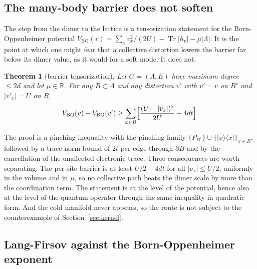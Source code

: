 \documentclass[11pt]{article}
\newtheorem{theorem}{Theorem}[section]
\theoremstyle{definition}
\theoremstyle{remark}
\begin{document}
\subsection{The many-body barrier does not soften}

The step from the dimer to the lattice is a tensorization statement for the
Born-Oppenheimer potential
$V_{\mathrm{BO}}(v)=\sum_{x}v_{x}^{2}/(2U)-\operatorname{Tr}|h_{v}|-\mu|\Lambda|$.
It is the point at which one might fear that a collective distortion lowers the
barrier far below its dimer value, as it would for a soft mode. It does not.

\begin{theorem}[barrier tensorization]\label{thm:valleytensor}
Let $G=(\Lambda,E)$ have maximum degree $\le2d$ and let $\mu\in\mathbb{R}$. For
any $B\subset\Lambda$ and any distortion $v'$ with $v'=v$ on $B^{c}$ and
$|v'_{x}|=U$ on $B$,
\begin{equation}
V_{\mathrm{BO}}(v)-V_{\mathrm{BO}}(v')
\ge\sum_{x\in B}\Bigl[\frac{(U-|v_{x}|)^{2}}{2U}-4dt\Bigr].
\label{eq:valleytensor}
\end{equation}
\end{theorem}

The proof is a pinching inequality with the pinching family
$\{P_{B^{c}}\}\cup\{|x\rangle\langle x|\}_{x\in B}$, followed by a trace-norm
bound of $2t$ per edge through $\partial B$ and by the cancellation of the
unaffected electronic trace. Three consequences are worth separating. The per-site
barrier is at least $U/2-4dt$ for all $|v_{x}|\le U/2$, uniformly in the volume
and in $\mu$, so no collective path beats the dimer scale by more than the
coordination term. The statement is at the level of the potential, hence also at
the level of the quantum operator through the same inequality in quadratic form.
And the cold manifold never appears, so the route is not subject to the
counterexample of Section~\ref{sec:kernel}.

\subsection{Lang-Firsov against the Born-Oppenheimer exponent}
\end{document}

